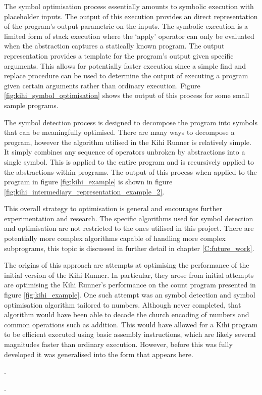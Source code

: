 The symbol optimisation process essentially amounts to symbolic execution with placeholder inputs. The output of this execution provides an direct representation of the program's output parametric on the inputs. The symbolic execution is a limited form of stack execution where the `apply' operator can only be evaluated when the abstraction captures a statically known program. The output representation provides a template for the program's output given specific arguments. This allows for potentially faster execution since a simple find and replace procedure can be used to determine the output of executing a program given certain arguments rather than ordinary execution. Figure \ref{fig:kihi_symbol_optimisation} shows the output of this process for some small sample programs. 



The symbol detection process is designed to decompose the program into symbols that can be meaningfully optimised. There are many ways to decompose a program, however the algorithm utilised in the Kihi Runner is relatively simple. It simply combines any sequence of operators unbroken by abstractions into a single symbol. This is applied to the entire program and is recursively applied to the abstractions within programs. The output of this process when applied to the program in figure \ref{fig:kihi_example} is shown in figure \ref{fig:kihi_intermediary_representation_example_2}.

This overall strategy to optimisation is general and encourages further experimentation and research. The specific algorithms used for symbol detection and optimisation are not restricted to the ones utilised in this project. There are potentially more complex algorithms capable of handling more complex subprograms, this topic is discussed in further detail in chapter \ref{C:future_work}.

The origins of this approach are attempts at optimising the performance of the initial version of the Kihi Runner. In particular, they arose from initial attempts are optimising the Kihi Runner's performance on the count program presented in figure \ref{fig:kihi_example}. One such attempt was an symbol detection and symbol optimisation algorithm tailored to numbers. Although never completed, that algorithm would have been able to decode the church encoding of numbers and common operations such as addition. This would have allowed for a Kihi program to be efficient executed using basic assembly instructions, which are likely several magnitudes faster than ordinary execution. However, before this was fully developed it was generalised into the form that appears here.

.

.

